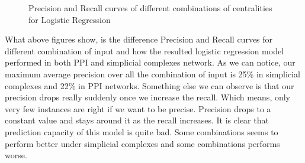\documentclass[9pt]{article}
\begin{document}
\begin{figure}[!htb]
\endminipage
\caption{Precision and Recall curves of different combinations of centralities for Logistic Regression}
\end{figure}
What above figures show, is the difference Precision and Recall curves for different combination of input and how the resulted logistic regression model performed in both PPI and simplicial complexes network. As we can notice, our maximum average precision over all the combination of input is 25\% in simplicial complexes and 22\% in PPI networks. Something else we can observe is that our precision drops really suddenly once we increase the recall. Which means, only very few instances are right if we want to be precise. Precision drops to a constant value and stays around it as the recall increases. It is clear that prediction capacity of this model is quite bad. Some combinations seems to perform better under simplicial complexes and some combinations performs worse.
\end{document}
